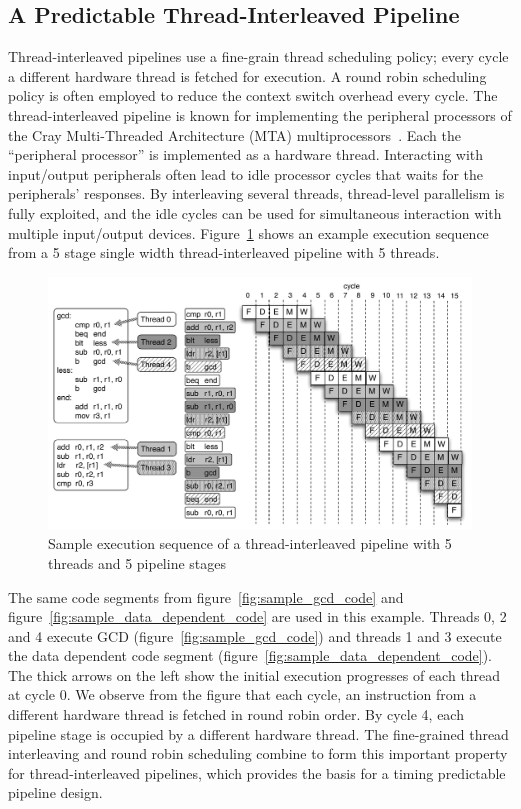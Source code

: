 \subsection{A Predictable Thread-Interleaved Pipeline}
\label{section:pret_thread_pipeline}
Thread-interleaved pipelines use a fine-grain thread scheduling policy; every cycle a different hardware thread is fetched for execution.
A round robin scheduling policy is often employed to reduce the context switch overhead every cycle.     
The thread-interleaved pipeline is known for implementing the peripheral processors of the Cray Multi-Threaded Architecture (MTA) multiprocessors~\cite{CDC6600}.
Each the ``peripheral processor'' is implemented as a hardware thread.     
Interacting with input/output peripherals often lead to idle processor cycles that waits for the peripherals' responses.
By interleaving several threads, thread-level parallelism is fully exploited, and the idle cycles can be used for simultaneous interaction with multiple input/output devices.       
Figure~\ref{fig:execution_thread_interleaved_pipeline} shows an example execution sequence from a 5 stage single width thread-interleaved pipeline with 5 threads.
\begin{figure}[h]
    \begin{center}
    \includegraphics[scale=.55]{figs/thread-interleaved-execution}
  \end{center}
  \vspace{-10pt}
  \caption{Sample execution sequence of a thread-interleaved pipeline with 5 threads and 5 pipeline stages}
  \label{fig:execution_thread_interleaved_pipeline}
\end{figure}

The same code segments from figure~\ref{fig:sample_gcd_code} and figure~\ref{fig:sample_data_dependent_code} are used in this example. 
Threads 0, 2 and 4 execute GCD (figure~\ref{fig:sample_gcd_code}) and threads 1 and 3 execute the data dependent code segment (figure~\ref{fig:sample_data_dependent_code}).
The thick arrows on the left show the initial execution progresses of each thread at cycle 0.
We observe from the figure that each cycle, an instruction from a different hardware thread is fetched in round robin order.
By cycle 4, each pipeline stage is occupied by a different hardware thread.
The fine-grained thread interleaving and round robin scheduling combine to form this important property for thread-interleaved pipelines, which provides the basis for a timing predictable pipeline design.

